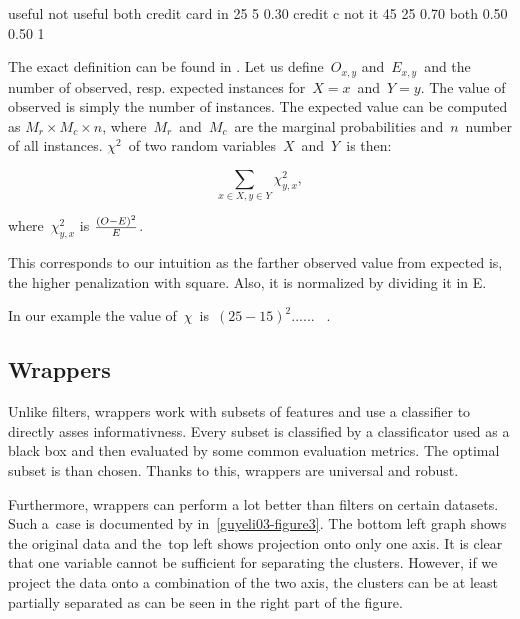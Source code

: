 \begin{code}
                 useful    not useful    both
credit card in     25          5          0.30   
credit c not it    45         25          0.70  
both               0.50         0.50          1

\end{code}

The exact definition can be found in \citet{Hugh13}.
Let us define~$O_{x,y}$ and~$E_{x,y}$~and the number of observed, resp. expected instances for~$X=x$~and~$Y=y$.
The value of observed is simply the number of instances.
The expected value can be computed as $M_r \times M_c \times n$, where~$M_r$~and~$M_c$~are the marginal probabilities and~$n$~number of all instances.
$\chi^2$~of two random variables~$X$~and~$Y$~is then:

$$\sum_{x \in X, y \in Y}{\chi^2_{y,x}},$$

where~${\chi^2_{y,x}}$ is $\left(O - E \right) ^ 2 \over E$.

This corresponds to our intuition as the farther observed value from expected is, the higher penalization with square.
Also, it is normalized by dividing it in E.

In our example the value of~$\chi$~is~$(25-15)^2......$~ .


\subsection{Wrappers}

Unlike filters, wrappers work with subsets of features and use a classifier to directly asses informativness.
Every subset is classified by a classificator used as a black box and then evaluated by some common evaluation metrics.
The optimal subset is than chosen. Thanks to this, wrappers are universal and robust.

Furthermore, wrappers can perform a lot better than filters on certain datasets. Such a~case is documented by \citet{GuyEli03} in~\ref{guyeli03-figure3}. The bottom left graph shows the original data and the~top left shows projection onto only one axis. It is clear that one variable cannot be sufficient for separating the clusters. However, if we project the data onto a combination of the two axis, the clusters can be at least partially separated as can be seen in the right part of the figure.
 
